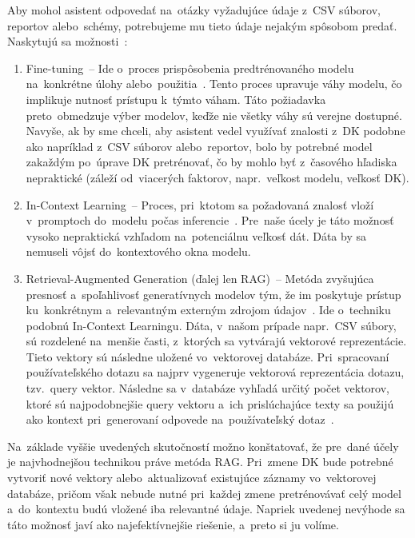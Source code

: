 Aby mohol asistent odpovedať na~otázky vyžadujúce údaje z~CSV súborov, reportov alebo~schémy, potrebujeme mu tieto údaje nejakým spôsobom predať. Naskytujú sa možnosti~\cite{giving-llm-context}:
\begin{enumerate}
\item Fine-tuning~-- Ide o~proces prispôsobenia predtrénovaného modelu na~konkrétne úlohy alebo~použitia~\cite{fine-tuning}. Tento proces upravuje váhy modelu, čo implikuje nutnosť prístupu k~týmto váham. Táto požiadavka preto~obmedzuje výber modelov, keďže nie všetky váhy sú verejne dostupné. Navyše, ak by sme chceli, aby asistent vedel využívať znalosti z~DK podobne ako napríklad z~CSV súborov alebo~reportov, bolo by potrebné model zakaždým po~úprave DK pretrénovať, čo by mohlo byť z~časového hľadiska nepraktické (záleží od~viacerých faktorov, napr.~veľkost modelu, veľkosť DK).

\item In-Context Learning~-- Proces, pri~ktotom sa požadovaná znalosť vloží v~promptoch do~modelu počas inferencie~\cite{in-context-learning}. Pre~naše úcely je táto možnosť vysoko nepraktická vzhľadom na~potenciálnu veľkosť dát. Dáta by sa nemuseli vôjsť do~kontextového okna modelu.

\item Retrieval-Augmented Generation (ďalej len RAG)~-- Metóda zvyšujúca presnosť a~spoľahlivosť generatívnych modelov tým, že im poskytuje prístup ku~konkrétnym a~relevantným externým zdrojom údajov~\cite{rag}. Ide o~techniku podobnú In-Context Learningu. Dáta, v~našom prípade napr.~CSV súbory, sú rozdelené na~menšie časti, z~ktorých sa vytvárajú vektorové reprezentácie. Tieto vektory sú následne uložené vo~vektorovej databáze. Pri~spracovaní používateľského dotazu sa najprv vygeneruje vektorová reprezentácia dotazu, tzv.~query vektor. Následne sa v~databáze vyhľadá určitý počet vektorov, ktoré sú najpodobnejšie query vektoru a~ich prislúchajúce texty sa použijú ako kontext pri~generovaní odpovede na~používateľský dotaz~\cite{vector-dbs-as-context-source}.
\end{enumerate}

Na~základe vyššie uvedených skutočností možno konštatovať, že pre~dané účely je najvhodnejšou technikou práve metóda RAG. Pri~zmene DK bude potrebné vytvoriť nové vektory alebo~aktualizovať existujúce záznamy vo~vektorovej databáze, pričom však nebude nutné pri~každej zmene pretrénovávať celý model a~do~kontextu budú vložené iba relevantné údaje. Napriek uvedenej nevýhode sa táto možnosť javí ako najefektívnejšie riešenie, a~preto si ju volíme.

